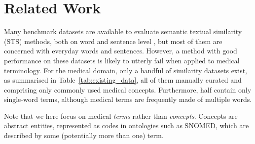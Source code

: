 \documentclass[letterpaper]{article} %
\begin{document}
\section{Related Work}

Many benchmark datasets are available to evaluate semantic textual similarity (STS) methods, both on word and sentence level \cite{ZhelezniakEtAl2019-correlation}, but 
most of them are concerned with everyday words and sentences.
However, a method with good performance on these datasets is likely to utterly fail when applied to medical terminology.
For the medical domain, only a handful of similarity datasets exist, as summarised in Table~\ref{tab:existing_data}, all of them manually curated and comprising only commonly used medical concepts.
Furthermore, half contain only single-word terms, although medical terms are frequently made of multiple words.

Note that we here focus on medical \emph{terms} rather than \emph{concepts}. Concepts are abstract entities, represented as codes in ontologies such as SNOMED, which are described by some (potentially more than one) term.
\end{document}
